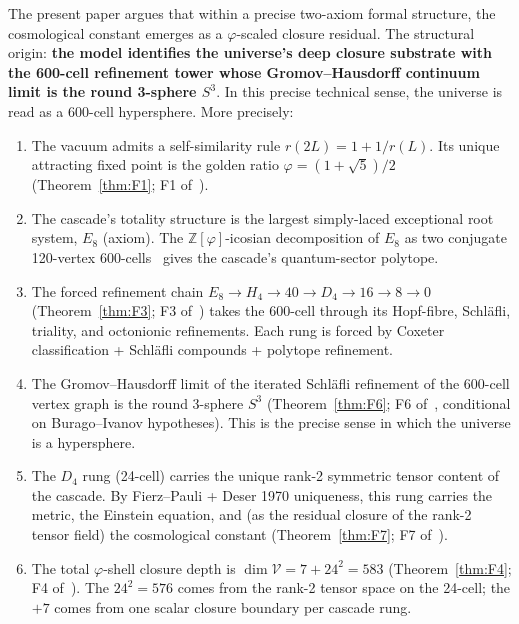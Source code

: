 \documentclass[11pt]{article}
\theoremstyle{plain}
\theoremstyle{definition}
\theoremstyle{remark}
\newcommand{\Zphi}{\mathbb{Z}[\varphi]}
\newcommand{\Vcal}{\mathcal{V}}
\begin{document}
The present paper argues that within a precise two-axiom formal structure, the cosmological constant emerges as a $\varphi$-scaled closure residual. The structural origin: \textbf{the model identifies the universe's deep closure substrate with the 600-cell refinement tower whose Gromov--Hausdorff continuum limit is the round 3-sphere $S^3$}. In this precise technical sense, the universe is read as a 600-cell hypersphere. More precisely:

\begin{enumerate}[leftmargin=2em, label=(\arabic*)]
\item The vacuum admits a self-similarity rule $r(2L) = 1 + 1/r(L)$. Its unique attracting fixed point is the golden ratio $\varphi = (1 + \sqrt 5)/2$ (Theorem~\ref{thm:F1}; F1 of~\citealp{SmartXXXVI}).

\item The cascade's totality structure is the largest simply-laced exceptional root system, $E_8$ (axiom). The $\Zphi$-icosian decomposition of $E_8$ as two conjugate 120-vertex 600-cells~\citep{Elkies1990, ConwaySloane} gives the cascade's quantum-sector polytope.

\item The forced refinement chain $E_8 \to H_4 \to 40 \to D_4 \to 16 \to 8 \to 0$ (Theorem~\ref{thm:F3}; F3 of~\citealp{SmartXXXVI}) takes the 600-cell through its Hopf-fibre, Schl\"afli, triality, and octonionic refinements. Each rung is forced by Coxeter classification + Schl\"afli compounds + polytope refinement.

\item The Gromov--Hausdorff limit of the iterated Schl\"afli refinement of the 600-cell vertex graph is the round 3-sphere $S^3$ (Theorem~\ref{thm:F6}; F6 of~\citealp{SmartXXXVI}, conditional on Burago--Ivanov hypotheses). This is the precise sense in which the universe is a hypersphere.

\item The $D_4$ rung (24-cell) carries the unique rank-2 symmetric tensor content of the cascade. By Fierz--Pauli + Deser 1970 uniqueness, this rung carries the metric, the Einstein equation, and (as the residual closure of the rank-2 tensor field) the cosmological constant (Theorem~\ref{thm:F7}; F7 of~\citealp{SmartXXXVI}).

\item The total $\varphi$-shell closure depth is $\dim \Vcal = 7 + 24^2 = 583$ (Theorem~\ref{thm:F4}; F4 of~\citealp{SmartXXXVI}). The $24^2 = 576$ comes from the rank-2 tensor space on the 24-cell; the $+7$ comes from one scalar closure boundary per cascade rung.


\end{enumerate}
\end{document}
